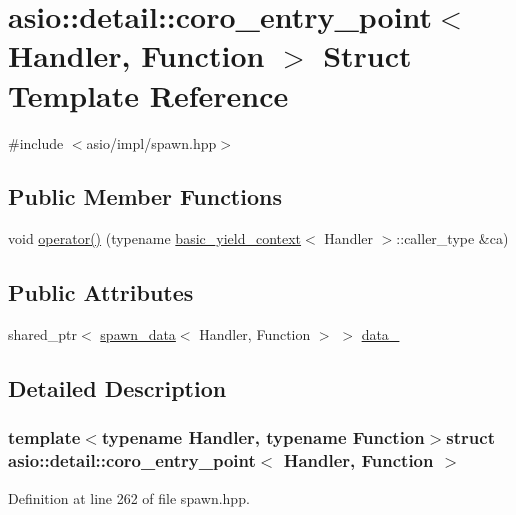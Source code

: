 \hypertarget{structasio_1_1detail_1_1coro__entry__point}{}\section{asio\+:\+:detail\+:\+:coro\+\_\+entry\+\_\+point$<$ Handler, Function $>$ Struct Template Reference}
\label{structasio_1_1detail_1_1coro__entry__point}


{\ttfamily \#include $<$asio/impl/spawn.\+hpp$>$}

\subsection*{Public Member Functions}
\begin{DoxyCompactItemize}
\item 
void \hyperlink{structasio_1_1detail_1_1coro__entry__point_a7bf557747cbbbc5f5224a3acbd7c68c1}{operator()} (typename \hyperlink{classasio_1_1basic__yield__context}{basic\+\_\+yield\+\_\+context}$<$ Handler $>$\+::caller\+\_\+type \&ca)
\end{DoxyCompactItemize}
\subsection*{Public Attributes}
\begin{DoxyCompactItemize}
\item 
shared\+\_\+ptr$<$ \hyperlink{structasio_1_1detail_1_1spawn__data}{spawn\+\_\+data}$<$ Handler, Function $>$ $>$ \hyperlink{structasio_1_1detail_1_1coro__entry__point_a2d0b5c4b298aadebbf347333af96c2c7}{data\+\_\+}
\end{DoxyCompactItemize}


\subsection{Detailed Description}
\subsubsection*{template$<$typename Handler, typename Function$>$struct asio\+::detail\+::coro\+\_\+entry\+\_\+point$<$ Handler, Function $>$}



Definition at line 262 of file spawn.\+hpp.



